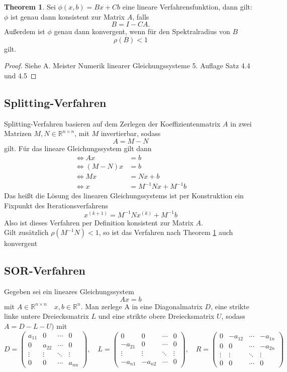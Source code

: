 \documentclass{scrartcl}
\newcommand\R{\mathbb{R}}
\theoremstyle{definition}
\newtheorem{theorem}{Theorem}
\begin{document}
\begin{theorem}\cite{Iterative}
    Sei \(\phi(x,b)=Bx+Cb\) eine lineare Verfahrensfunktion, dann gilt:
    \(\phi\) ist genau dann konsistent zur Matrix \(A\), falls
    \[B=I-CA.\]
    Außerdem ist \(\phi\) genau dann konvergent, wenn für den Spektralradius von \(B\)
    \[\rho(B)<1\]\label{Thrm:Spectralradius}
    gilt.   
\end{theorem}
\begin{proof}
    Siehe A. Meister Numerik linearer Gleichungssysteme 5. Auflage Satz 4.4 und 4.5
\end{proof}
\subsection{Splitting-Verfahren}
Splitting-Verfahren basieren auf dem Zerlegen der Koeffizientenmatrix \(A\) in zwei Matrizen
\(M, N \in \R^{n \times n}\), mit \(M\) invertierbar, sodass 
\[A = M-N\]
gilt.
Für das lineare Gleichungssystem gilt dann
\begin{align*}
        \iff Ax &= b \\
    \iff (M-N)x &= b \\
        \iff Mx &= Nx + b\\
         \iff x &= M^{-1}Nx + M^{-1}b
\end{align*}\cite{SOR}
Das heißt die Lösung des linearen Gleichungssystems ist per Konstruktion ein Fixpunkt des Iterationsverfahrens 
\[x^{(k+1)}= M^{-1}Nx^{(k)} + M^{-1}b\]
Also ist dieses Verfahren per Definition konsistent zur Matrix \(A\). \\
Gilt zusätzlich \(\rho(M^{-1}N) < 1\), so ist das Verfahren nach Theorem \ref{Thrm:Spectralradius}
auch konvergent


\subsection{SOR-Verfahren}
Gegeben sei ein lineares Gleichungssystem 
\[Ax = b\]
mit \(A \in \mathbb{R}^{n \times n} \quad x,b \in \mathbb{R}^n\).
Man zerlege A in eine Diagonalmatrix \(D\), eine strikte linke untere Dreiecksmatrix 
\(L\) und eine strikte obere Dreiecksmatrix \(U\), sodass
\(A = D -L-U)\) mit
\[
D = \begin{pmatrix}
a_{11} & 0 & \cdots & 0 \\
0 & a_{22} & \cdots & 0 \\
\vdots & \vdots & \ddots & \vdots \\
0 & 0 & \cdots & a_{nn}
\end{pmatrix}, \quad
L = \begin{pmatrix}
0 & 0 & \cdots & 0 \\
-a_{21} & 0 & \cdots & 0 \\
\vdots & \vdots & \ddots & \vdots \\
-a_{n1} & -a_{n2} & \cdots & 0
\end{pmatrix}, \quad
R = \begin{pmatrix}
0 & -a_{12} & \cdots & -a_{1n} \\
0 & 0 & \cdots & -a_{2n} \\
\vdots & \vdots & \ddots & \vdots \\
0 & 0 & \cdots & 0
\end{pmatrix}
\]
\end{document}

